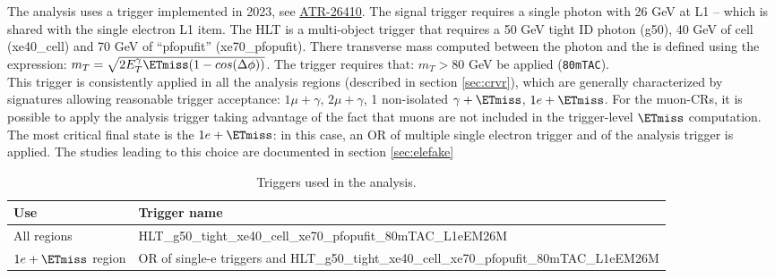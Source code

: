 The analysis uses a trigger implemented in 2023, see \href{https://its.cern.ch/jira/browse/ATR-26410}{ATR-26410}. 
The signal trigger requires a single photon with 26 GeV at L1 -- which is shared with the single electron L1 item. The HLT is a multi-object trigger that requires a 50 GeV tight ID photon (g50), 40 GeV of cell \ETmiss (xe40\_cell) and 70 GeV of ``pfopufit'' \ETmiss (xe70\_pfopufit). There transverse mass computed between the photon and the \ETmiss is defined using the expression: $m_T = \sqrt{2 E_{T}^{\gamma}\ETmiss (1-cos(\Delta \phi))}$. The trigger requires that: $m_T > 80$ GeV be applied (\texttt{80mTAC}).\\

This trigger is consistently applied in all the analysis regions (described in section \ref{sec:crvr}), which are generally characterized by signatures allowing reasonable trigger acceptance: $1\mu+\gamma$, $2\mu+\gamma$, 1 non-isolated $\gamma+\ETmiss$, $1e+\ETmiss$. For the muon-CRs, it is possible to apply the analysis trigger taking advantage of the fact that muons are not included in the trigger-level $\ETmiss$ computation. The most critical final state is the $1e+\ETmiss$: in this case, an OR of multiple single electron trigger and of the analysis trigger is applied. The studies leading to this choice are documented in section \ref{sec:elefake}

\begin{table}[ht]
\centering
\caption{Triggers used in the analysis.}
\label{tab:trigger-list}
\begin{tabular}{ll}
\toprule
Use & Trigger name \\
\midrule
All regions & HLT\_g50\_tight\_xe40\_cell\_xe70\_pfopufit\_80mTAC\_L1eEM26M \\
$1e+\ETmiss$ region &  OR of single-e triggers and HLT\_g50\_tight\_xe40\_cell\_xe70\_pfopufit\_80mTAC\_L1eEM26M \\
\bottomrule
\end{tabular}
\end{table}
